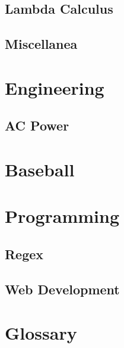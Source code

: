 \documentclass[10pt,letterpaper]{scrartcl}
\begin{document}
\subsection{Lambda Calculus}
\subsection[Misc.]{Miscellanea}

\newpage\section{Engineering}
\subsection{AC Power}

\newpage\section{Baseball}

\newpage\section{Programming}
\subsection{Regex}
\subsection{Web Development}

\newpage\section{Glossary}
\end{document}
